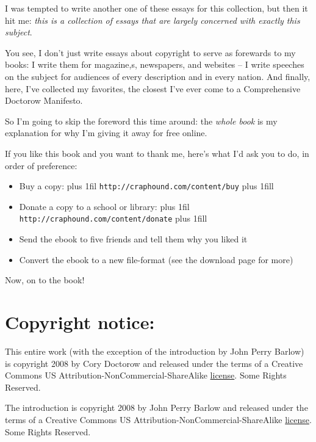 I was tempted to write another one of these essays for this
collection, but then it hit me:
\emph{this is a collection of essays that are largely concerned with exactly this subject}.

You see, I don't just write essays about copyright to serve as
forewards to my books: I write them for magazine,s, newspapers, and
websites -- I write speeches on the subject for audiences of every
description and in every nation. And finally, here, I've collected
my favorites, the closest I've ever come to a Comprehensive
Doctorow Manifesto.

So I'm going to skip the foreword this time around: the
\emph{whole book} is my explanation for why I'm giving it away
for free online.

If you like this book and you want to thank me, here's what I'd ask
you to do, in order of preference:

\begin{itemize}
\item
  Buy a copy: {\hskip 0pt plus 1fil
  \discretionary{}{}{}
  \texttt{http://craphound.com/content/buy} \hskip 0pt plus 1fill}
  \vrule width 0pt
\item
  Donate a copy to a school or library: \hskip 0pt plus 1fil
  \discretionary{}{}{}
  \texttt{http://craphound.com/content/donate} \hskip 0pt plus 1fill
  \vrule width 0pt
\item
  Send the ebook to five friends and tell them why you liked it
\item
  Convert the ebook to a new file-format (see the download page for
  more)
\end{itemize}
Now, on to the book!

\section{Copyright notice:}

This entire work (with the exception of the introduction by John
Perry Barlow) is copyright 2008 by Cory Doctorow and released under
the terms of a Creative Commons US
Attribution-NonCommercial-ShareAlike
\href{http://creativecommons.org/licenses/by-nc-sa/3.0/us}{license}.
Some Rights Reserved.

The introduction is copyright 2008 by John Perry Barlow and
released under the terms of a Creative Commons US
Attribution-NonCommercial-ShareAlike
\href{http://creativecommons.org/licenses/by-nc-sa/3.0/us}{license}.
Some Rights Reserved.

